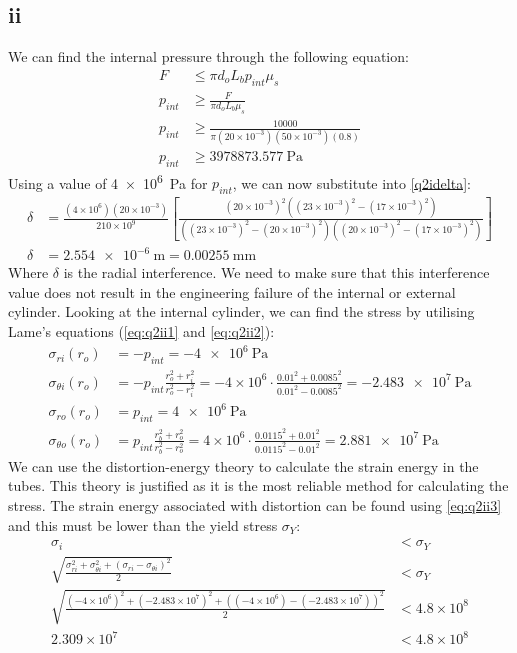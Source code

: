 \documentclass[11pt]{article}
\numberwithin{equation}{section}
\begin{document}
\subsection{ii}
We can find the internal pressure through the following equation:
\begin{align}
    F &\leq \pi d_o L_b p_{int} \mu_s\\
    p_{int} &\geq \frac{F}{\pi d_o L_b \mu_s}\\
    p_{int} &\geq \frac{10000}{\pi (20\times 10^{-3})(50\times 10^{-3})(0.8)}\\
    p_{int} &\geq \SI{3978873.577}{\pascal}
\end{align}
Using a value of \SI{4e6}{\pascal} for $p_{int}$, we can now substitute into \ref{q2idelta}:
\begin{align}
    \delta &= \frac{(4\times 10^{6})(20\times 10^{-3})}{210\times 10^9}\left[\frac{(20\times 10^{-3})^2\left((23\times 10^{-3})^2-(17\times 10^{-3})^2\right)}{\left((23\times 10^{-3})^2 - (20\times 10^{-3})^2\right)\left((20\times 10^{-3})^2-(17\times 10^{-3})^2\right)}\right]\\
    \delta &= \SI{2.554e-6}{\meter} = \SI{0.00255}{\milli\meter}
\end{align}
Where $\delta$ is the radial interference. We need to make sure that this interference value does not result in the engineering failure of the internal or external cylinder. Looking at the internal cylinder, we can find the stress by utilising Lame's equations (\ref{eq:q2ii1} and \ref{eq:q2ii2}):
\begin{align}
    \sigma_{ri} \left(r_o\right) &= -p_{int} = \SI{-4e6}{\pascal}\\
    \sigma_{\theta i} \left(r_o\right) &= -p_{int}\frac{r_o^2 + r_i^2}{r_o^2 - r_i^2} = -4\times 10^6 \cdot \frac{0.01^2 + 0.0085^2}{0.01^2 - 0.0085^2} = \SI{-2.483e7}{\pascal}\\
    \sigma_{ro} \left(r_o\right) &= p_{int} = \SI{4e6}{\pascal}\\
    \sigma_{\theta o} \left(r_o\right) &= p_{int}\frac{r_b^2 + r_o^2}{r_b^2 -r_o^2} = 4\times 10^6 \cdot \frac{0.0115^2 + 0.01^2}{0.0115^2 -0.01^2} = \SI{2.881e7}{\pascal}
\end{align}
We can use the distortion-energy theory to calculate the strain energy in the tubes. This theory is justified as it is the most reliable method for calculating the stress. The strain energy associated with distortion can be found using \ref{eq:q2ii3} and this must be lower than the yield stress $\sigma_Y$:
\begin{align}
    \sigma_i &< \sigma_Y\\
    \sqrt{\frac{\sigma_{ri}^2 + \sigma_{\theta i}^2 + \left(\sigma_{ri} - \sigma_{\theta i}\right)^2}{2}} &< \sigma_Y \label{eq:q2ii3}\\
    \sqrt{\frac{(-4\times10^6)^2 + (-2.483\times 10^7)^2 + \left((-4\times 10^6) - (-2.483\times 10^7)\right)^2}{2}} &< 4.8\times 10^8\\
    2.309\times 10^7 &< 4.8 \times 10^8
\end{align}
\end{document}
